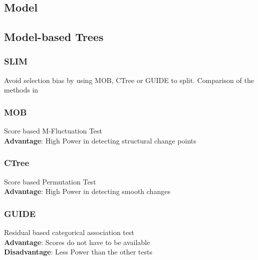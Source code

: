 \subsection{Model}

\subsection{Model-based Trees}
\subsubsection{SLIM}
Avoid selection bias by using MOB, CTree or GUIDE to split.
Comparison of the methods in \citep{Schlosser.24.06.2019}

\subsubsection{MOB}
Score based M-Fluctuation Test \\
\textbf{Advantage}: High Power in detecting structural change points
\subsubsection{CTree}
Score based Permutation Test \\
\textbf{Advantage}: High Power in detecting smooth changes

\subsubsection{GUIDE}
Residual based categorical association test\\
\textbf{Advantage}: Scores do not have to be available\\
\textbf{Disadvantage}: Less Power than the other tests

